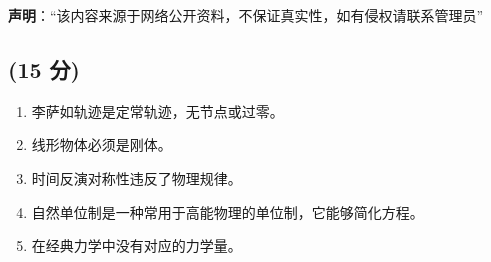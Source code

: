 
\textbf{声明}：“该内容来源于网络公开资料，不保证真实性，如有侵权请联系管理员”

\subsection{(15 分)}
\begin{enumerate}
    \item 李萨如轨迹是定常轨迹，无节点或过零。
    \item 线形物体必须是刚体。
    \item 时间反演对称性违反了物理规律。
    \item 自然单位制是一种常用于高能物理的单位制，它能够简化方程。
    \item 在经典力学中没有对应的力学量。
\end{enumerate}
